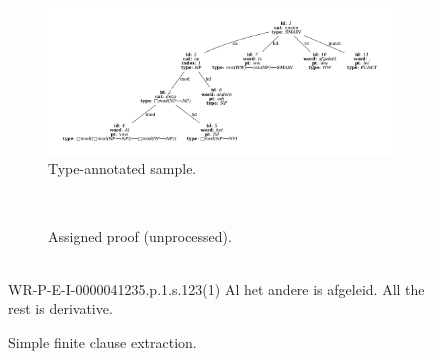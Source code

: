 \begin{figure}
	\begin{subfigure}{1\textwidth}
		\includegraphics[width=1\textwidth, trim={1.5cm 1.5cm 1.5cm 1.5cm}]{./prebuilt/simple_extraction.pdf}
		\caption{Type-annotated sample.}
	\end{subfigure}\\[\midsep]
	\begin{subfigure}{1\textwidth}
		\caption{Assigned proof (unprocessed).}
	\end{subfigure}\\[\midsep]
	\aethelcap
		{WR-P-E-I-0000041235.p.1.s.123(1)}
		{Al het andere is afgeleid.}
		{All the rest is derivative.}
		{}
	\caption{Simple finite clause extraction.}
	\label{figure:simple_extraction}
\end{figure}
%

